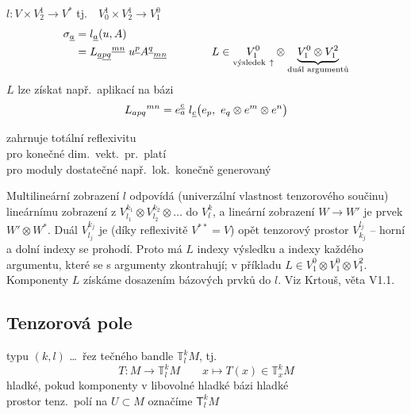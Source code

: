 \begin{priklad}[Př.]
$l: V\times V^1_2\to V^*$ \quad tj.\ \ $V^1_0\times V^1_2\to V^0_1$
\begin{align*}
  \sigma_{\gmIpa} &= l_{\gmIpa}(u,A) \\
  &= L_{\gmIpa\underline{p}\underline{q}}{}^{\underline{m}\underline{n}}\;u^{\underline{p}}A^{\underline{q}}{}_{\underline{m}\underline{n}}
  \qquad\qquad L\in \underset{\text{výsledek}\ \uparrow}{V^0_1}\otimes\underbrace{V^0_1\otimes V^2_1}_{\text{duál argumentů}}
\end{align*}
$L$ lze získat např.\ aplikací na bázi
\[
  L_{apq}{}^{mn} = e^{\underline{c}}_a\;l_{\underline{c}}\big(e_p,\ e_q\otimes e^m\otimes e^n\big)
\]
\end{priklad}

zahrnuje totální reflexivitu \\
\quad pro konečné dim.\ vekt.\ pr.\ platí \\
\quad pro moduly dostatečné např.\ lok.\ konečně generovaný

\begin{vysvetleni}
Multilineární zobrazení $l$ odpovídá (univerzální vlastnost tenzorového součinu) lineárnímu zobrazení z $V^{k_1}_{l_1}\otimes V^{k_2}_{l_2}\otimes\dots$ do $V^k_l$, a lineární zobrazení $W\to W'$ je prvek $W'\otimes W^*$. Duál $V^{k_j}_{l_j}$ je (díky reflexivitě $V^{**}=V$) opět tenzorový prostor $V^{l_j}_{k_j}$ -- horní a dolní indexy se prohodí. Proto má $L$ indexy výsledku a  indexy každého argumentu, které se s argumenty zkontrahují; v příkladu $L\in V^0_1\otimes V^0_1\otimes V^2_1$. Komponenty $L$ získáme dosazením bázových prvků do $l$. Viz Krtouš, věta V1.1.
\end{vysvetleni}

\subsection{Tenzorová pole}
\providecommand{\gmIpF}{\mathcal{F}}

\begin{definice}
 typu $(k,l)$ \dots\ řez tečného bandle $\mathbb{T}^k_lM$, tj.
\[
  T: M\to\mathbb{T}^k_lM \qquad x\mapsto T(x)\in\mathbb{T}^k_xM
\]
\quad hladké, pokud komponenty v libovolné hladké bázi hladké \\
\quad prostor tenz.\ polí na $U\subset M$ označíme $\mathsf{T}^k_lM$
\end{definice}

